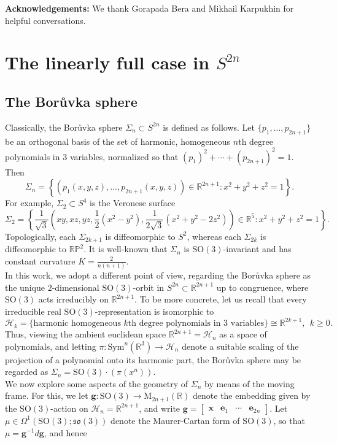 \documentclass[11pt]{article}
\newcommand{\SO}{\mathrm{SO}}
\newcommand{\Sym}{\mathrm{Sym}}
\newcommand{\R}{\mathbb{R}}
\newcommand{\RP}{\mathbb{RP}}
\newcommand{\Hc}{\mathcal{H}}
\theoremstyle{definition}
\numberwithin{equation}{section}
\begin{document}
\noindent \textbf{Acknowledgements:} We thank Gorapada Bera and Mikhail Karpukhin for helpful conversations.

\section{The linearly full case in $S^{2n}$} \label{sec:LinFull}

\subsection{The Bor{\r{u}}vka sphere}

\indent \indent Classically, the Bor{\r{u}}vka sphere $\Sigma_n \subset S^{2n}$ is defined as follows.  Let $\{p_1, \ldots, p_{2n+1}\}$ be an orthogonal basis of the set of harmonic, homogeneous $n$th degree polynomials in $3$ variables, normalized so that $(p_1)^2 + \cdots + (p_{2n+1})^2 = 1$.  Then
$$\Sigma_n = \left\{ \left( p_1(x,y,z), \ldots, p_{2n+1}(x,y,z) \right) \in \R^{2n+1} \colon x^2 + y^2 + z^2 = 1 \right\}.$$
For example, $\Sigma_2 \subset S^4$ is the Veronese surface
$$\Sigma_2 = \textstyle \left\{ \frac{1}{\sqrt{3}}\!\left( xy, xz, yz, \frac{1}{2}(x^2 - y^2), \frac{1}{2\sqrt{3}}(x^2 + y^2 - 2z^2)\right) \in \R^5 \colon x^2 +y^2 + z^2 = 1 \right\}\!.$$
Topologically, each $\Sigma_{2k+1}$ is diffeomorphic to $S^2$, whereas each $\Sigma_{2k}$ is diffeomorphic to $\RP^2$.  It is well-known that $\Sigma_n$ is $\SO(3)$-invariant and has constant curvature $K = \frac{2}{n(n+1)}$.   \\
\indent In this work, we adopt a different point of view, regarding the Bor{\r{u}}vka sphere as the unique $2$-dimensional $\SO(3)$-orbit in $S^{2n} \subset \R^{2n+1}$ up to congruence, where $\SO(3)$ acts irreducibly on $\R^{2n+1}$.  To be more concrete, let us recall that every irreducible real $\SO(3)$-representation is isomorphic to
$$\mathcal{H}_k = \{\text{harmonic homogeneous }k\text{th degree polynomials in 3 variables}\} \cong \R^{2k+1}, \ \ k \geq 0.$$
Thus, viewing the ambient euclidean space $\R^{2n+1} = \mathcal{H}_n$ as a space of polynomials, and letting $\pi \colon \Sym^n(\R^3) \to \mathcal{H}_n$ denote a suitable scaling of the projection of a polynomial onto its harmonic part, the Bor{\r{u}}vka sphere may be regarded as $\Sigma_n = \SO(3) \cdot (\pi(x^n))$. \\
\indent We now explore some aspects of the geometry of $\Sigma_n$ by means of the moving frame.  For this, we let $\mathbf{g} \colon \SO(3) \to \mathrm{M}_{2n+1}(\R)$ denote the embedding given by the $\SO(3)$-action on $\Hc_n = \R^{2n+1}$, and write $\mathbf{g} = \begin{bmatrix} \mathbf{x} & \mathbf{e}_1 & \cdots & \mathbf{e}_{2n} \end{bmatrix}$.  Let $\mu \in \Omega^1(\SO(3); \mathfrak{so}(3))$ denote the Maurer-Cartan form of $\SO(3)$, so that $\mu = \mathbf{g}^{-1}d\mathbf{g}$, and hence
\end{document}
